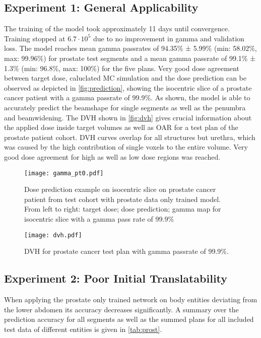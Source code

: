 \subsection{Experiment 1: General Applicability}

The training of the model took approximately 11 days until convergence. 
Training stopped at $6.7\cdot10^5$ due to no improvement in gamma and validation loss. 
The model reaches mean gamma passrates of 94.35\% ± 5.99\% (min: 58.02\%, max: 99.96\%) for prostate test segments and a mean gamma passrate of 99.1\% ± 1.3\% (min: 96.8\%, max: 100\%) for the five plans.
Very good dose agreement between target dose, caluclated \acs{MC} simulation and the dose prediction can be observed as depicted in \autoref{fig:prediction}, showing the isocentric slice of a prostate cancer patient with a gamma passrate of 99.9\%.
As shown, the model is able to accurately predict the beamshape for single segments as well as the penumbra and beamwidening. 
The \ac{DVH} shown in \autoref{fig:dvh} gives crucial information about the applied dose inside target volumes as well as \ac{OAR} for a test plan of the prostate patient cohort.
\acs{DVH} curves overlap for all structures but urethra, which was caused by the high contribution of single voxels to the entire volume. 
Very good dose agreement for high as well as low dose regions was reached. 

\begin{figure}[htb]
    \centering
    \texttt{[image: gamma\_pt0.pdf]}
    \caption{
        Dose prediction example on isocentric slice on prostate cancer patient from test cohort with prostate data only trained model. 
        From left to right: target dose; dose prediction; gamma map for isocentric slice with a gamma pass rate of 99.9\%
    }\label{fig:prediction}
\end{figure}

\begin{figure}
    \centering
    \texttt{[image: dvh.pdf]}
    \caption{\acs{DVH} for prostate cancer test plan with gamma passrate of 99.9\%.}\label{fig:dvh}
\end{figure}

\subsection{Experiment 2: Poor Initial Translatability}

When applying the prostate only trained network on body entities deviating from the lower abdomen its accuracy decreases significantly. 
A summary over the prediction accuracy for all segments as well as the summed plans for all included test data of different entities is given in \autoref{tab:prost}. 

